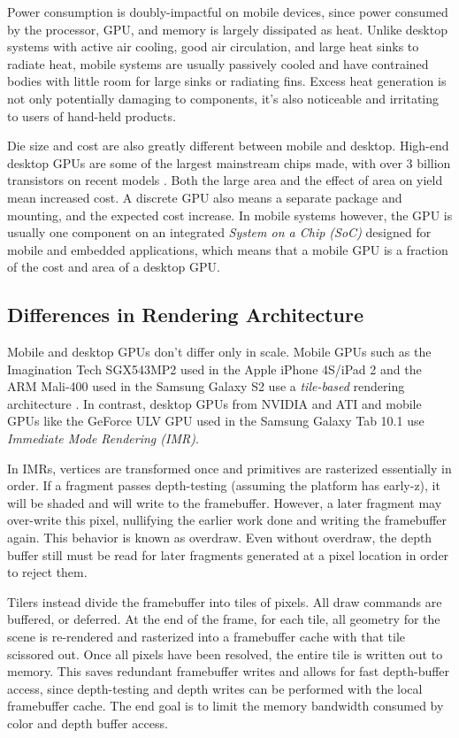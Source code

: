 Power consumption is doubly-impactful on mobile devices, since power consumed
by the processor, GPU, and memory is largely dissipated as heat.  Unlike
desktop systems with active air cooling, good air circulation, and large heat
sinks to radiate heat, mobile systems are usually passively cooled and have
contrained bodies with little room for large sinks or radiating fins.  Excess
heat generation is not only potentially damaging to components, it's also
noticeable and irritating to users of hand-held products.

Die size and cost are also greatly different between mobile and desktop.
High-end desktop GPUs are some of the largest mainstream chips made, with over
3 billion transistors on recent models \cite{Walton10}.  Both the large area
and the effect of area on yield mean increased cost.  A discrete GPU also means
a separate package and mounting, and the expected cost increase.  In mobile
systems however, the GPU is usually one component on an integrated
\textit{System on a Chip (SoC)} designed for mobile and embedded applications,
which means that a mobile GPU is a fraction of the cost and area of a desktop
GPU.

\subsection{Differences in Rendering Architecture}
\label{Jon-McCaffrey:differences-in-rendering-architecture}
  Mobile and desktop GPUs don't
differ only in scale.  Mobile GPUs such as the Imagination Tech SGX543MP2 used
in the Apple iPhone 4S/iPad 2 and the ARM Mali-400 used in the Samsung Galaxy S2
use a \textit{tile-based} rendering architecture \cite{Klug11a}.  In
contrast, desktop GPUs from NVIDIA and ATI and mobile GPUs like the
GeForce ULV GPU used in the Samsung Galaxy Tab 10.1 use \textit{Immediate Mode
Rendering (IMR)}.

In IMRs, vertices are transformed once and primitives are rasterized
essentially in order.  If a fragment passes depth-testing (assuming the
platform has early-z), it will be shaded and will write to the framebuffer.
However, a later fragment may over-write this pixel, nullifying the earlier
work done and writing the framebuffer again.  This behavior is known as overdraw.
Even without overdraw, the depth buffer still must be read for later fragments 
generated at a pixel location in order to reject them.

Tilers instead divide the framebuffer into tiles of pixels.  All draw commands
are buffered, or deferred.  At the end of the frame, for each tile, all
geometry for the scene is re-rendered and rasterized into a framebuffer cache
with that tile scissored out.  Once all pixels have been resolved, the entire
tile is written out to memory.  This saves redundant framebuffer writes and
allows for fast depth-buffer access, since depth-testing and depth writes can
be performed with the local framebuffer cache.  The end goal is to limit the
memory bandwidth consumed by color and depth buffer access.

